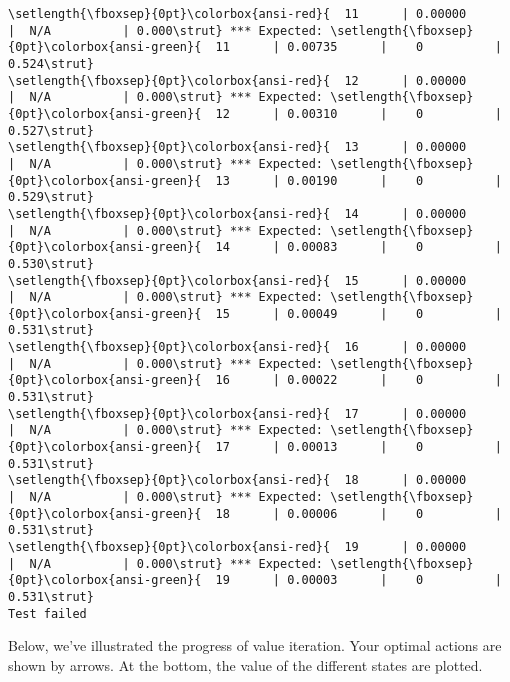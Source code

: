 \documentclass[11pt]{article}
\begin{document}
\begin{Verbatim}[commandchars=\\\{\}]
\setlength{\fboxsep}{0pt}\colorbox{ansi-red}{  11      | 0.00000      |  N/A          | 0.000\strut} *** Expected: \setlength{\fboxsep}{0pt}\colorbox{ansi-green}{  11      | 0.00735      |    0          | 0.524\strut}
\setlength{\fboxsep}{0pt}\colorbox{ansi-red}{  12      | 0.00000      |  N/A          | 0.000\strut} *** Expected: \setlength{\fboxsep}{0pt}\colorbox{ansi-green}{  12      | 0.00310      |    0          | 0.527\strut}
\setlength{\fboxsep}{0pt}\colorbox{ansi-red}{  13      | 0.00000      |  N/A          | 0.000\strut} *** Expected: \setlength{\fboxsep}{0pt}\colorbox{ansi-green}{  13      | 0.00190      |    0          | 0.529\strut}
\setlength{\fboxsep}{0pt}\colorbox{ansi-red}{  14      | 0.00000      |  N/A          | 0.000\strut} *** Expected: \setlength{\fboxsep}{0pt}\colorbox{ansi-green}{  14      | 0.00083      |    0          | 0.530\strut}
\setlength{\fboxsep}{0pt}\colorbox{ansi-red}{  15      | 0.00000      |  N/A          | 0.000\strut} *** Expected: \setlength{\fboxsep}{0pt}\colorbox{ansi-green}{  15      | 0.00049      |    0          | 0.531\strut}
\setlength{\fboxsep}{0pt}\colorbox{ansi-red}{  16      | 0.00000      |  N/A          | 0.000\strut} *** Expected: \setlength{\fboxsep}{0pt}\colorbox{ansi-green}{  16      | 0.00022      |    0          | 0.531\strut}
\setlength{\fboxsep}{0pt}\colorbox{ansi-red}{  17      | 0.00000      |  N/A          | 0.000\strut} *** Expected: \setlength{\fboxsep}{0pt}\colorbox{ansi-green}{  17      | 0.00013      |    0          | 0.531\strut}
\setlength{\fboxsep}{0pt}\colorbox{ansi-red}{  18      | 0.00000      |  N/A          | 0.000\strut} *** Expected: \setlength{\fboxsep}{0pt}\colorbox{ansi-green}{  18      | 0.00006      |    0          | 0.531\strut}
\setlength{\fboxsep}{0pt}\colorbox{ansi-red}{  19      | 0.00000      |  N/A          | 0.000\strut} *** Expected: \setlength{\fboxsep}{0pt}\colorbox{ansi-green}{  19      | 0.00003      |    0          | 0.531\strut}
Test failed

    \end{Verbatim}

    Below, we've illustrated the progress of value iteration. Your optimal
actions are shown by arrows. At the bottom, the value of the different
states are plotted.
\end{document}
